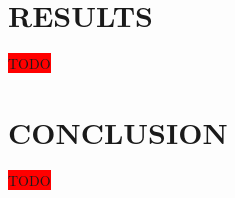 \documentclass[12pt, conference]{ieeeconf}
\newcommand{\todo}{\colorbox{red}{TODO}}
\begin{document}
\section{RESULTS}

\todo

\section{CONCLUSION}

\todo



\printbibliography
\end{document}
